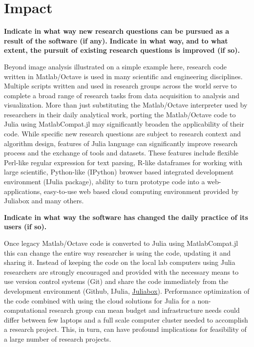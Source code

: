 \section{Impact}

\textbf{Indicate in what way new research questions can be pursued as a result of the software (if any).}
\textbf{Indicate in what way, and to what extent, the pursuit of existing research questions is improved (if so).}

Beyond image analysis illustrated on a simple example here, research code written in Matlab/Octave is used in many scientific and engineering disciplines. Multiple scripts written and used in research groups across the world serve to complete a broad range of research tasks from data acquisition to analysis and visualization. More than just substituting the Matlab/Octave interpreter used by researchers in their daily analytical work, porting the Matlab/Octave code to Julia using MatlabCompat.jl may significantly broaden the applicability of their code. While specific new research questions are subject to research context and algorithm design, features of Julia language can significantly improve research process and the exchange of tools and datasets. These features include flexible Perl-like regular expression for text parsing, R-like dataframes for working with large scientific, Python-like (IPython) browser based integrated development environment (IJulia package), ability to turn prototype code into a web-applications, easy-to-use web based cloud computing environment provided by Juliabox and many others.

\textbf{Indicate in what way the software has changed the daily practice of its users (if so).}

Once legacy Matlab/Octave code is converted to Julia using MatlabCompat.jl this can change the entire way researcher is using the code, updating it and sharing it. Instead of keeping the code on the local lab computers using Julia researchers are strongly encouraged and provided with the necessary means to use version control systems (Git) and share the code immediately from the development environment (Github, IJulia, \href{https://www.juliabox.org/}{Juliabox}). Performance optimization of the code combined with using the cloud solutions for Julia for a non-computational research group can mean budget and infrastructure needs could differ between few laptops and a full scale computer cluster needed to accomplish a research project. This, in turn, can have profound implications for feasibility of a large number of research projects.

